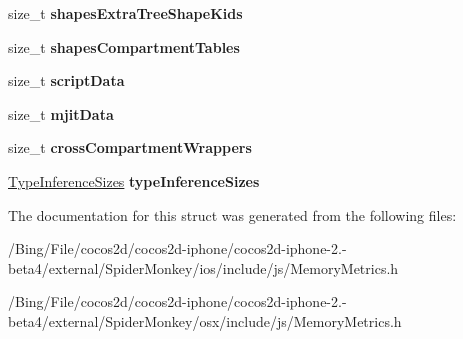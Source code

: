 \begin{DoxyCompactItemize}
\item 
\hypertarget{struct_j_s_1_1_compartment_stats_a2976de617a0b62c0bb69ecaa8df1329d}{size\-\_\-t {\bfseries shapes\-Extra\-Tree\-Shape\-Kids}}\label{struct_j_s_1_1_compartment_stats_a2976de617a0b62c0bb69ecaa8df1329d}

\item 
\hypertarget{struct_j_s_1_1_compartment_stats_af352cbae5ef010d64eb31e3008027246}{size\-\_\-t {\bfseries shapes\-Compartment\-Tables}}\label{struct_j_s_1_1_compartment_stats_af352cbae5ef010d64eb31e3008027246}

\item 
\hypertarget{struct_j_s_1_1_compartment_stats_a35404946ac7563d916605b2aae072327}{size\-\_\-t {\bfseries script\-Data}}\label{struct_j_s_1_1_compartment_stats_a35404946ac7563d916605b2aae072327}

\item 
\hypertarget{struct_j_s_1_1_compartment_stats_a893bdeb853a81dc7f39efaf1e948b1dc}{size\-\_\-t {\bfseries mjit\-Data}}\label{struct_j_s_1_1_compartment_stats_a893bdeb853a81dc7f39efaf1e948b1dc}

\item 
\hypertarget{struct_j_s_1_1_compartment_stats_a8445e957129d18fdd4966e69e048cce1}{size\-\_\-t {\bfseries cross\-Compartment\-Wrappers}}\label{struct_j_s_1_1_compartment_stats_a8445e957129d18fdd4966e69e048cce1}

\item 
\hypertarget{struct_j_s_1_1_compartment_stats_aec4873d04ca36cddeb14d398ff19f5e0}{\hyperlink{struct_j_s_1_1_type_inference_sizes}{Type\-Inference\-Sizes} {\bfseries type\-Inference\-Sizes}}\label{struct_j_s_1_1_compartment_stats_aec4873d04ca36cddeb14d398ff19f5e0}

\end{DoxyCompactItemize}


The documentation for this struct was generated from the following files\-:\begin{DoxyCompactItemize}
\item 
/\-Bing/\-File/cocos2d/cocos2d-\/iphone/cocos2d-\/iphone-\/2.-\/beta4/external/\-Spider\-Monkey/ios/include/js/Memory\-Metrics.\-h\item 
/\-Bing/\-File/cocos2d/cocos2d-\/iphone/cocos2d-\/iphone-\/2.-\/beta4/external/\-Spider\-Monkey/osx/include/js/Memory\-Metrics.\-h\end{DoxyCompactItemize}
